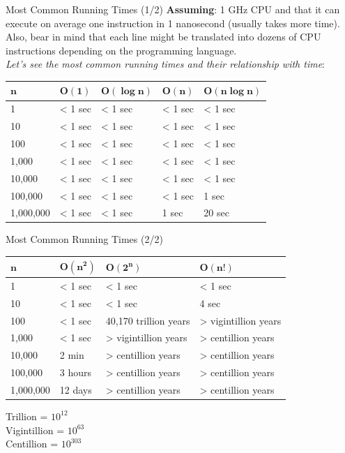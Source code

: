 \documentclass[pdf]{beamer}
\theoremstyle{mystyle}
\begin{document}
\begin{frame}{Most Common Running Times (1/2)}
	 \textbf{Assuming}: 1 GHz CPU and that it can execute on average one instruction in 1 nanosecond (usually takes more time). Also, bear in mind that each line might be translated into dozens of CPU instructions depending on the programming language. \\
	 \textit{Let's see the most common running times and their relationship with time}:
	 \begin{center}
	 	\begin{tabular}{|l|l|l|l|l|}
	 		\hline
	 		$\bm{n}$ & $\bm{O(1)}$ & $\bm{O(\log n)}$ & $\bm{O(n)}$ & $\bm{O(n \log n)}$ \\
	 		\hline
	 		1 			& < 1 sec & < 1 sec 	& < 1 sec & < 1 sec \\
	 		\hline
	 		10 			& < 1 sec & < 1 sec 	& < 1 sec & < 1 sec \\
	 		\hline
	 		100 			& < 1 sec & < 1 sec 	& < 1 sec & < 1 sec \\
	 		\hline
	 		1,000 		& < 1 sec & < 1 sec 	& < 1 sec & < 1 sec \\
	 		\hline
	 		10,000 		& < 1 sec & < 1 sec 	& < 1 sec & < 1 sec \\
	 		\hline
	 		100,000 		& < 1 sec & < 1 sec 	& < 1 sec &  1 sec \\
	 		\hline
	 		1,000,000 	& < 1 sec & < 1 sec 	& 1 sec &  20 sec \\
	 		\hline
	 	\end{tabular}
	 \end{center}
\end{frame}

\begin{frame}{Most Common Running Times (2/2)}
	 \begin{center}
	 	\begin{tabular}{|l|l|l|l|}
	 		\hline
	 		$\bm{n}$ & $\bm{O(n^2)}$ & $\bm{O(2^n)}$ & $\bm{O(n!)}$  \\
	 		\hline
	 		1 			& < 1 sec 	& < 1 sec 				& < 1 sec  \\
	 		\hline
	 		10 			& < 1 sec 	& < 1 sec 				& 4 sec  \\
	 		\hline
	 		100 			& < 1 sec 	& 40,170 trillion years 	& > vigintillion years  \\
	 		\hline
	 		1,000 		& < 1 sec 	& > vigintillion years 	& > centillion years  \\
	 		\hline
	 		10,000 		& 2 min 		& > centillion years 	& > centillion years  \\
	 		\hline
	 		100,000 		& 3 hours 	& > centillion years 	& > centillion years  \\
	 		\hline
	 		1,000,000 	& 12 days 	& > centillion years 	& > centillion years  \\
	 		\hline
	 	\end{tabular}
	 \end{center}
	Trillion = $10^{12}$ \\ 
	Vigintillion = $10^{63}$ \\
	Centillion = $10^{303}$
\end{frame}
\end{document}

